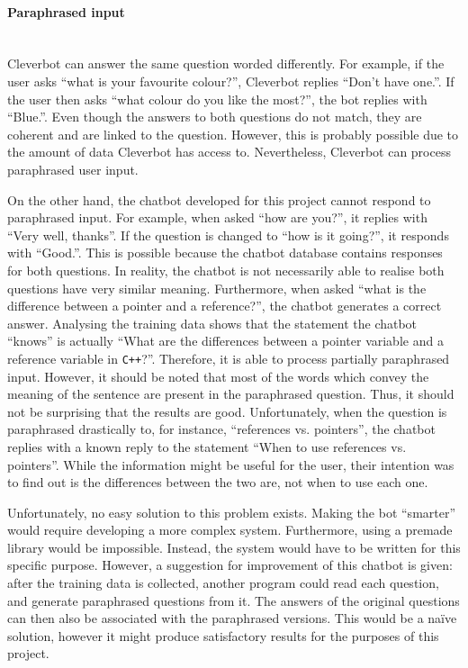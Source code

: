 \documentclass[12pt,a4paper]{article}
\newcommand{\myparagraph}[1]{\paragraph{#1}\mbox{}\\}
\begin{document}
\myparagraph{Paraphrased input}
Cleverbot can answer the same question worded differently. For example, if the user asks “what is your favourite colour?”, Cleverbot replies “Don’t have one.”. If the user then asks “what colour do you like the most?”, the bot replies with “Blue.”. Even though the answers to both questions do not match, they are coherent and are linked to the question. However, this is probably possible due to the amount of data Cleverbot has access to. Nevertheless, Cleverbot can process paraphrased user input. 

On the other hand, the chatbot developed for this project cannot respond to paraphrased input. For example, when asked “how are you?”, it replies with “Very well, thanks”. If the question is changed to “how is it going?”, it responds with “Good.”. This is possible because the chatbot database contains responses for both questions. In reality, the chatbot is not necessarily able to realise both questions have very similar meaning. Furthermore, when asked “what is the difference between a pointer and a reference?”, the chatbot generates a correct answer. Analysing the training data shows that the statement the chatbot “knows” is actually “What are the differences between a pointer variable and a reference variable in \texttt{C++}?”. Therefore, it is able to process partially paraphrased input. However, it should be noted that most of the words which convey the meaning of the sentence are present in the paraphrased question. Thus, it should not be surprising that the results are good. Unfortunately, when the question is paraphrased drastically to, for instance, “references vs. pointers”, the chatbot replies with a known reply to the statement “When to use references vs. pointers”. While the information might be useful for the user, their intention was to find out is the differences between the two are, not when to use each one.

Unfortunately, no easy solution to this problem exists. Making the bot “smarter” would require developing a more complex system. Furthermore, using a premade library would be impossible. Instead, the system would have to be written for this specific purpose. However, a suggestion for improvement of this chatbot is given: after the training data is collected, another program could read each question, and generate paraphrased questions from it. The answers of the original questions can then also be associated with the paraphrased versions. This would be a naïve solution, however it might produce satisfactory results for the purposes of this project.
\end{document}
